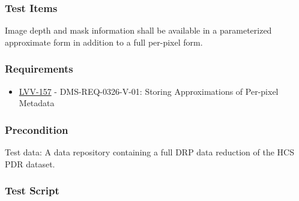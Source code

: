 \hypertarget{test-items}{%
\subsubsection{Test Items}\label{test-items}}

Image depth and mask information shall be available in a parameterized
approximate form in addition to a full per-pixel form.

\hypertarget{requirements}{%
\subsubsection{Requirements}\label{requirements}}

\begin{itemize}
\tightlist
\item
  \href{https://jira.lsstcorp.org/browse/LVV-157}{LVV-157} -
  DMS-REQ-0326-V-01: Storing Approximations of Per-pixel Metadata
\end{itemize}

\hypertarget{precondition}{%
\subsubsection{Precondition}\label{precondition}}

Test data: A data repository containing a full DRP data reduction of the
HCS PDR dataset.

\hypertarget{test-script}{%
\subsubsection{Test Script}\label{test-script}}

